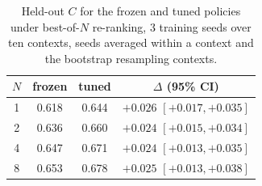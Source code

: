 \begin{table}[t]
\centering
\caption[GRPO against best-of-$N$ re-ranking]{Held-out $C$ for the frozen and tuned policies under best-of-$N$ re-ranking, 3 training seeds over ten contexts, seeds averaged within a context and the bootstrap resampling contexts.\\}
\label{tab:grpo-bon}
\begin{tabular}{cccc}
\toprule
$N$ & frozen & tuned & $\Delta$ (95\% CI) \\
\midrule
1 & 0.618 & 0.644 & $+0.026$ $[+0.017, +0.035]$ \\
2 & 0.636 & 0.660 & $+0.024$ $[+0.015, +0.034]$ \\
4 & 0.647 & 0.671 & $+0.024$ $[+0.013, +0.035]$ \\
8 & 0.653 & 0.678 & $+0.025$ $[+0.013, +0.038]$ \\
\bottomrule
\end{tabular}
\end{table}
